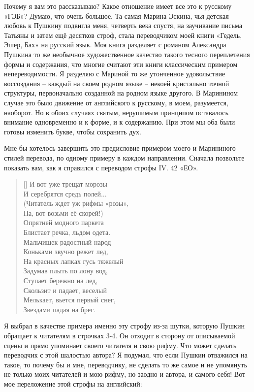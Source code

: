 \documentclass[../main.tex]{subfiles}
\begin{document}
Почему я вам это рассказываю?
Какое отношение имеет все это к русскому «ГЭБ»?
Думаю, что очень большое.
Та самая Марина Эскина, чья детская любовь к Пушкину подвигла меня, четверть века спустя, на заучивание письма Татьяны и затем ещё десятков строф, стала переводчиком моей книги «Гедель, Эшер, Бах» на русский язык.
Моя книга разделяет с романом Александра Пушкина то же необычное художественное качество такого тесного переплетения формы и содержания, что многие считают эти книги классическим примером непереводимости.
Я разделяю с Мариной то же утонченное удовольствие воссоздания \--- каждый на своем родном языке \--- некоей кристально точной структуры, первоначально созданной на родном языке другого.
В Маринином случае это было движение от английского к русскому, в моем, разумеется, наоборот.
Но в обоих случаях святым, нерушимым принципом оставалось внимание одновременно и к форме, и к содержанию.
При этом мы оба были готовы изменить букве, чтобы сохранить дух.

Мне бы хотелось завершить это предисловие примером моего и Марининого стилей перевода, по одному примеру в каждом направлении.
Сначала позвольте показать вам, как я справился с переводом строфы IV. 42 «ЕО».

\settowidth{\versewidth}{Читатель ждет уж рифмы «розы»,}
\begin{verse}[\versewidth]
    И вот уже трещат морозы \\
    И серебрятся средь полей... \\
    (Читатель ждет уж рифмы «розы», \\
    На, вот возьми её скорей!) \\
    Опрятней модного паркета \\
    Блистает речка, льдом одета. \\
    Мальчишек радостный народ \\
    Коньками звучно режет лед, \\
    На красных лапках гусь тяжелый \\
    Задумав плыть по лону вод, \\
    Ступает бережно на лед, \\
    Скользит и падает, веселый \\
    Мелькает, вьется первый снег, \\
    Звездами падая на брег.
\end{verse}

Я выбрал в качестве примера именно эту строфу из-за шутки, которую Пушкин обращает к читателям в строчках 3-4.
Он отходит в сторону от описываемой сцены и прямо упоминает своего читателя и свою рифму.
Что может сделать переводчик с этой шалостью автора?
Я подумал, что если Пушкин отважился на такое, то почему бы и мне, переводчику, не сделать то же самое и не упомянуть не только моих читателей и мою рифму, но заодно и автора, и самого себя!
Вот мое переложение этой строфы на английский:
\end{document}

